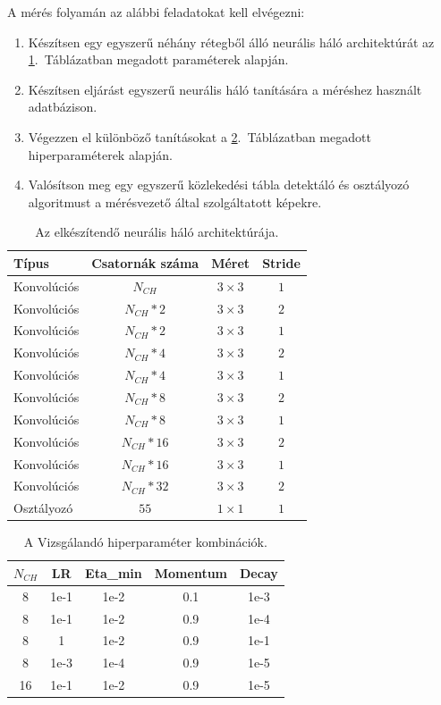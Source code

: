 \documentclass[12pt,a4paper,oneside]{report}             %
\begin{document}
A mérés folyamán az alábbi feladatokat kell elvégezni:

\begin{enumerate}
\item Készítsen egy egyszerű néhány rétegből álló neurális háló architektúrát az \ref{tab:1}.~Táblázatban megadott paraméterek alapján.
\item Készítsen eljárást egyszerű neurális háló tanítására a méréshez használt adatbázison.
\item Végezzen el különböző tanításokat a \ref{tab:2}.~Táblázatban megadott hiperparaméterek alapján.
\item Valósítson meg egy egyszerű közlekedési tábla detektáló és osztályozó algoritmust a mérésvezető által szolgáltatott képekre.
\end{enumerate}

\begin{table}[!htb]
	\centering
	\begin{tabular}{| l | c | c | c |}
		\hline
		\textbf{Típus} & \textbf{Csatornák száma} & \textbf{Méret} & \textbf{Stride} \\ \hline \hline
		Konvolúciós & $N_{CH}$ & $3\times 3$ & $1$ \\ \hline
		Konvolúciós & $N_{CH}*2$ & $3\times 3$ & $2$ \\ \hline
		Konvolúciós & $N_{CH}*2$ & $3\times 3$ & $1$ \\ \hline
		Konvolúciós & $N_{CH}*4$ & $3\times 3$ & $2$ \\ \hline
		Konvolúciós & $N_{CH}*4$ & $3\times 3$ & $1$ \\ \hline
		Konvolúciós & $N_{CH}*8$ & $3\times 3$ & $2$ \\ \hline
		Konvolúciós & $N_{CH}*8$ & $3\times 3$ & $1$ \\ \hline
		Konvolúciós & $N_{CH}*16$ & $3\times 3$ & $2$ \\ \hline
		Konvolúciós & $N_{CH}*16$ & $3\times 3$ & $1$ \\ \hline
		Konvolúciós & $N_{CH}*32$ & $3\times 3$ & $2$ \\ \hline
		Osztályozó & $55$ & $1\times 1$ & $1$ \\ \hline
	\end{tabular}
\caption{Az elkészítendő neurális háló architektúrája.}
\label{tab:1}
\end{table}

\begin{table}[!htb]
\centering
\begin{tabular}{| c | c | c | c | c |}
	\hline
	$N_{CH}$ & \textbf{LR} & \textbf{Eta\_min} & \textbf{Momentum} & \textbf{Decay} \\ \hline \hline
	8 & 1e-1 & 1e-2 & 0.1 & 1e-3 \\ \hline
	8 & 1e-1 & 1e-2 & 0.9 & 1e-4  \\ \hline
	8 & 1 & 1e-2 & 0.9 & 1e-1  \\ \hline
	8 & 1e-3 & 1e-4 & 0.9 & 1e-5  \\ \hline
	16 & 1e-1& 1e-2 & 0.9 & 1e-5  \\ \hline
\end{tabular}
\caption{A Vizsgálandó hiperparaméter kombinációk.}
\label{tab:2}
\end{table}
\end{document}
